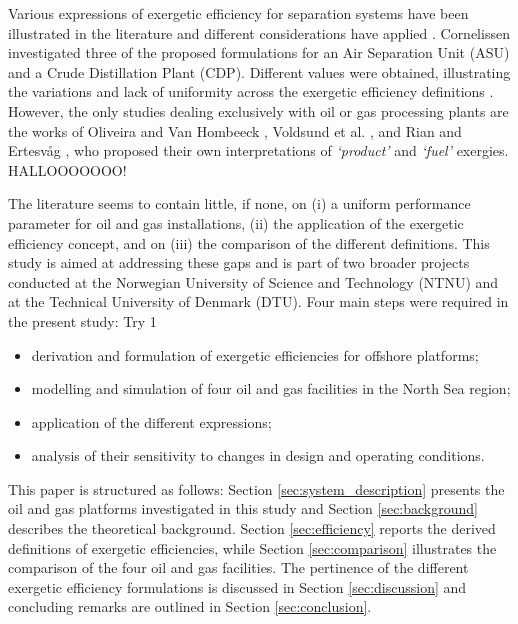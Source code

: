 \documentclass[times,3p]{elsarticle}
\begin{document}
Various expressions of exergetic efficiency for separation systems have been illustrated in the literature and different considerations have applied \cite{Brodyansky1994,Kotas1995,Tsatsaronis1993,Sorin1994a}. Cornelissen \cite{Cornelissen1997} investigated three of the proposed formulations for an Air Separation Unit (ASU) and a Crude Distillation Plant (CDP). Different values were obtained, illustrating the variations and lack of uniformity across the exergetic efficiency definitions \cite{Baehr1965,Baehr1968,Lior2007}. However, the only studies dealing exclusively with oil or gas processing plants are the works of Oliveira and Van Hombeeck \cite{Oliveira1997}, Voldsund et al. \cite{Voldsund2010,Voldsund2012}, and Rian and Ertesv\aa g \cite{Rian2012}, who proposed their own interpretations of \emph{`product'} and \emph{`fuel'} exergies. HALLOOOOOOO!

The literature seems to contain little, if none, on (i) a uniform performance parameter for oil and gas installations, (ii) the application of the exergetic efficiency concept, and on (iii) the comparison of the different definitions. This study is aimed at addressing these gaps and is part of two broader projects conducted at the Norwegian University of Science and Technology (NTNU) and at the Technical University of Denmark (DTU). Four main steps were required in the present study:
Try 1
\begin{itemize}
	\item derivation and formulation of exergetic efficiencies for offshore platforms;
	\item modelling and simulation of four oil and gas facilities in the North Sea region;
	\item application of the different expressions;
	\item analysis of their sensitivity to changes in design and operating conditions.
\end{itemize}

This paper is structured as follows: Section \ref{sec:system_description} presents the oil and gas platforms investigated in this study and Section \ref{sec:background} describes the theoretical background. Section \ref{sec:efficiency} reports the derived definitions of exergetic efficiencies, while Section \ref{sec:comparison} illustrates the comparison of the four oil and gas facilities. The pertinence of the different exergetic efficiency formulations is discussed in Section \ref{sec:discussion} and concluding remarks are outlined in Section \ref{sec:conclusion}.
\end{document}
